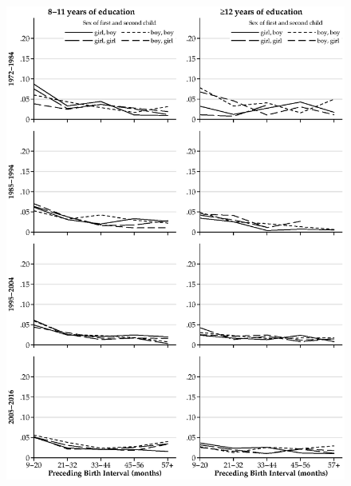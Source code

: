 \documentclass[12pt,letterpaper]{article}
\begin{document}
\begin{figure}
\centering
\includegraphics[width=\textwidth,height=\textheight,keepaspectratio=true]{mortality_spell_2_high_highest}
\end{figure}



\clearpage

\onehalfspacing



\end{document}
